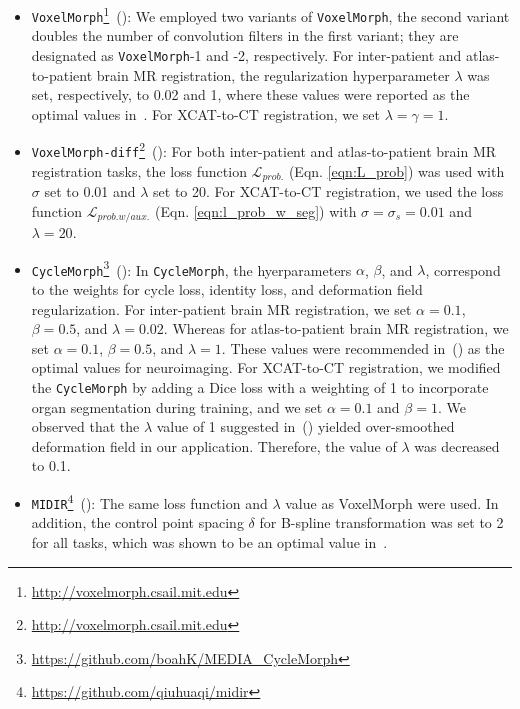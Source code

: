 \documentclass[times,twocolumn,final]{elsarticle}
\begin{document}
\begin{itemize}[noitemsep]
    \item \texttt{VoxelMorph}\footnote{\url{http://voxelmorph.csail.mit.edu}}~(\cite{balakrishnan2018unsupervised,balakrishnan2019voxelmorph}): We employed two variants of \texttt{VoxelMorph}, the second variant doubles the number of convolution filters in the first variant; they are designated as \texttt{VoxelMorph}-1 and -2, respectively. For inter-patient and atlas-to-patient brain MR registration, the regularization hyperparameter $\lambda$ was set, respectively, to 0.02 and 1, where these values were reported as the optimal values in~\cite{balakrishnan2019voxelmorph}. For XCAT-to-CT registration, we set $\lambda=\gamma=1$.
    \item \texttt{VoxelMorph-diff}\footnote{\url{http://voxelmorph.csail.mit.edu}}~(\cite{dalca2019unsupervised}): For both inter-patient and atlas-to-patient brain MR registration tasks, the loss function $\mathcal{L}_{prob.}$ (Eqn. \ref{eqn:L_prob}) was used with $\sigma$ set to 0.01 and $\lambda$ set to 20. For XCAT-to-CT registration, we used the loss function $\mathcal{L}_{prob. w/ aux.}$ (Eqn. \ref{eqn:l_prob_w_seg}) with $\sigma=\sigma_s=0.01$ and $\lambda=20$.
    \item \texttt{CycleMorph}\footnote{\url{https://github.com/boahK/MEDIA_CycleMorph}}~(\cite{kim2021cyclemorph}): In \texttt{CycleMorph}, the hyerparameters $\alpha$, $\beta$, and $\lambda$, correspond to the weights for cycle loss, identity loss, and deformation field regularization. For inter-patient brain MR registration, we set $\alpha=0.1$, $\beta=0.5$, and $\lambda=0.02$. Whereas for atlas-to-patient brain MR registration, we set $\alpha=0.1$, $\beta=0.5$, and $\lambda=1$. These values were recommended in~(\cite{kim2021cyclemorph}) as the optimal values for neuroimaging. For XCAT-to-CT registration, we modified the \texttt{CycleMorph} by adding a Dice loss with a weighting of 1 to incorporate organ segmentation during training, and we set $\alpha=0.1$ and $\beta=1$. We observed that the $\lambda$ value of 1 suggested in~(\cite{kim2021cyclemorph}) yielded over-smoothed deformation field in our application. Therefore, the value of $\lambda$ was decreased to 0.1. 
    \item \texttt{MIDIR}\footnote{\url{https://github.com/qiuhuaqi/midir}}~(\cite{qiu2021learning}): The same loss function and $\lambda$ value as VoxelMorph were used. In addition, the control point spacing $\delta$ for B-spline transformation was set to 2 for all tasks, which was shown to be an optimal value in~\cite{qiu2021learning}. 
\end{itemize}
\end{document}
